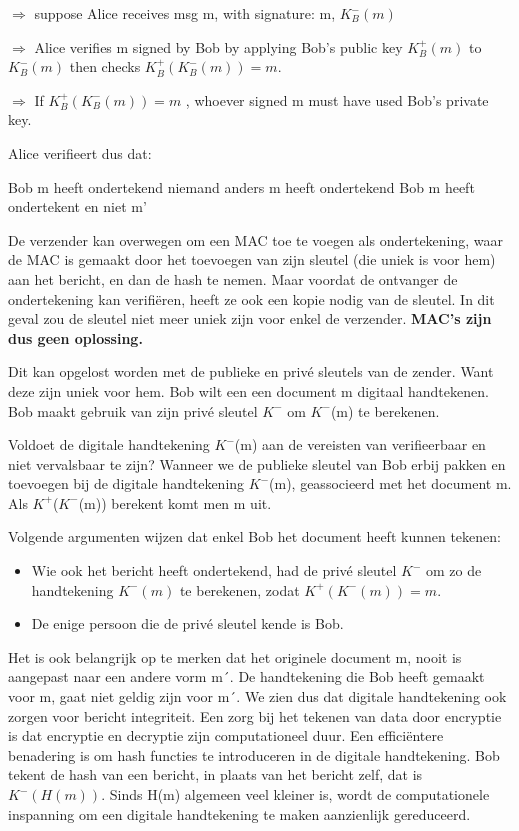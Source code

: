\noindent $\Rightarrow$ suppose Alice receives msg m, with signature: m,  $K^-_B (m)$

\noindent $\Rightarrow$ Alice verifies m signed by Bob by applying Bob’s public key  $K^+_B (m)$ to  $K^-_B (m)$ then checks  $K^+_B (K^-_B (m)) = m $.

\noindent $\Rightarrow$ If $K^+_B (K^-_B (m)) = m $ , whoever signed m must have used Bob’s private key.

\noindent Alice verifieert dus dat:

\bi
\itf Bob m heeft ondertekend
\itf niemand anders m heeft ondertekend
\itf Bob m heeft ondertekent en niet m'
\ei

\noindent De verzender kan overwegen om een MAC toe te voegen als ondertekening, waar de MAC is gemaakt door het toevoegen van zijn sleutel (die uniek is voor hem) aan het bericht, en dan de hash te nemen. Maar voordat de ontvanger de ondertekening kan verifiëren, heeft ze ook een kopie nodig van de sleutel. In dit geval zou de sleutel niet meer uniek zijn voor enkel de verzender. \textbf{MAC’s zijn dus geen oplossing.}

\noindent Dit kan opgelost worden met de publieke en privé sleutels van de zender. Want deze zijn uniek voor hem. Bob wilt een een document m digitaal handtekenen. Bob maakt gebruik van zijn privé sleutel $K^-$ om $K^-$(m) te berekenen.

\noindent Voldoet de digitale handtekening $K^-$(m) aan de vereisten van verifieerbaar en niet vervalsbaar te zijn? Wanneer we de publieke sleutel van Bob erbij pakken en toevoegen bij de digitale handtekening $K^-$(m), geassocieerd met het document m. Als $K^+$($K^-$(m)) berekent komt men m uit. 

\noindent Volgende argumenten wijzen dat enkel Bob het document heeft kunnen tekenen:
\begin{itemize}
\item Wie ook het bericht heeft ondertekend, had de privé sleutel $K^-$ om zo de handtekening $K^- (m)$ te berekenen, zodat $K^+(K^- (m)) = m$.
\item De enige persoon die de privé sleutel kende is Bob.
\end{itemize}
\noindent Het is ook belangrijk op te merken dat het originele document m, nooit is aangepast naar een andere vorm m´. De handtekening die Bob heeft gemaakt voor m, gaat niet geldig zijn voor m´. We zien dus dat digitale handtekening ook zorgen voor bericht integriteit.
Een zorg bij het tekenen van data door encryptie is dat encryptie en decryptie zijn computationeel duur. Een efficiëntere benadering is om hash functies te introduceren in de digitale handtekening. Bob tekent de hash van een bericht, in plaats van het bericht zelf, dat is $K^{-}(H(m))$. Sinds H(m) algemeen veel kleiner is, wordt de computationele inspanning om een digitale handtekening te maken aanzienlijk gereduceerd.

